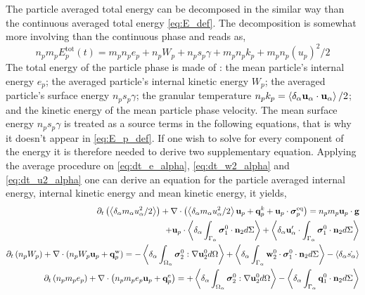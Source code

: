 The particle averaged total energy can be decomposed in the similar way than the continuous averaged total energy \ref{eq:E_def}. 
The decomposition is somewhat more involving than the continuous phase and reads as, 
\begin{equation*}
    n_p m_p E_p^\text{tot}(t) 
    = m_p n_p e_p 
    + n_p W_p
    + n_p s_p \gamma
    + m_p n_p k_p
    + m_p n_p (u_p)^2/2
    \label{eq:E_p_def}
\end{equation*}
The total energy of the particle phase is made of :
the mean particle's internal energy $e_p$; 
the averaged particle's internal kinetic energy $W_p$;
the averaged particle's surface energy $n_p s_p \gamma$;
the granular temperature $n_p k_p =\left<\delta_\alpha \textbf{u}_\alpha \cdot\textbf{u}_\alpha\right>/2$;
and the kinetic energy of the mean particle phase velocity. 
The mean surface energy $n_p s_p \gamma$ is treated as a source terms in the following equations, that is why it doesn't appear in \ref{eq:E_p_def}.  
If one wish to solve for every component of the energy it is therefore needed to derive two supplementary equation. 
Applying the average procedure on \ref{eq:dt_e_alpha}, \ref{eq:dt_w2_alpha} and \ref{eq:dt_u2_alpha} one can derive an equation for the particle averaged internal energy, internal kinetic energy and mean kinetic energy, it yields, 
\begin{align}
    \label{eq:dt_hybrid_u2p}
    \partial_t \left(\left<\delta_\alpha m_\alpha u_\alpha^2/2\right>\right)
    + \mathbf{\nabla}\cdot \left(\left<\delta_\alpha m_\alpha u_\alpha^2/2\right> \textbf{u}_p 
    + \textbf{q}^k_p
    + \textbf{u}_p \cdot \bm{\sigma}_p^\text{eq}
    \right)
    = 
    n_p m_p \textbf{u}_p \cdot
    \textbf{g}\nonumber\\  
    + \textbf{u}_p\cdot\left<\delta_\alpha \int_{\Gamma_\alpha} {\bm{\sigma}_1^0 \cdot \textbf{n}_2} d\Sigma\right>
    + \left<\delta_\alpha \textbf{u}_\alpha'\cdot\int_{\Gamma_\alpha} \bm{\sigma}_1^0 \cdot \textbf{n}_2 d\Sigma\right>
    \\
    \label{eq:dt_hybrid_Wp}
    \partial_t \left(n_p W_p\right)
    + \mathbf{\nabla}\cdot 
    (n_p W_p
    \textbf{u}_p 
    +  \textbf{q}_p^\text{w}
    )
    = 
    - \left<\delta_\alpha \int_{\Omega_\alpha} {\bm{\sigma}_2^0 : \mathbf{\nabla}\textbf{u}_2^0} d\Omega\right>
    + \left<\delta_\alpha \int_{\Gamma_\alpha} {\textbf{w}_2^0 \cdot \bm{\sigma}_1^0 \cdot  \textbf{n}_2} d\Sigma\right>
    - \left<\delta_\alpha \dot{ s_\alpha}\right>
    \\
    \partial_t \left(n_p m_p e_p\right)
    + \mathbf{\nabla}\cdot \left(n_p
    m_p e_p \textbf{u}_p 
    +  \textbf{q}_p^\text{e}
    \right)
    = 
    + \left<\delta_\alpha \int_{\Omega_\alpha} {\bm{\sigma}_2^0 : \mathbf{\nabla}\textbf{u}_2^0} d\Omega\right>
    - \left<\delta_\alpha \int_{\Gamma_\alpha} {\textbf{q}_1^0\cdot \textbf{n}_2} d\Sigma\right>
    \label{eq:dt_hybrid_ep}
\end{align}

